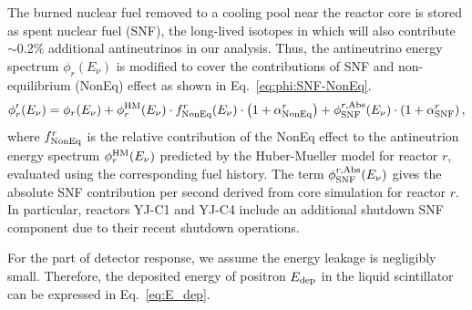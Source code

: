 The burned nuclear fuel removed to a cooling pool near the reactor core is stored as spent nuclear fuel (SNF), the long-lived isotopes in which will also contribute $\sim$0.2\% additional antineutrinos in our analysis. Thus, the antineutrino energy spectrum $\phi_r(E_{\nu})$ is modified to cover the contributions of SNF and non-equilibrium (NonEq) effect as shown in Eq.~\eqref{eq:phi:SNF-NonEq}.
\begin{equation}
    \phi^\prime_r(E_{\nu})=\phi_r(E_{\nu})+\phi_r^{\rm HM}(E_{\nu}) \cdot f_{\rm NonEq}^r(E_{\nu})\cdot \left(1+\alpha_{\rm NonEq}^r\right)+\phi_{\rm SNF}^{r,\rm Abs}(E_{\nu})\cdot\left(1+\alpha_{\rm SNF}^r\right),
    \label{eq:phi:SNF-NonEq}
\end{equation}
where $f_{\rm NonEq}^r$ is the relative contribution of the NonEq effect to the antineutrion energy spectrum $\phi_r^{\rm HM}(E_{\nu})$ predicted by the Huber-Mueller model for reactor $r$, evaluated using the corresponding fuel history. The term $\phi_{\rm SNF}^{r,\rm Abs}(E_{\nu})$ gives the absolute SNF contribution per second derived from core simulation for reactor $r$. In particular, reactors YJ-C1 and YJ-C4 include an additional shutdown SNF component due to their recent shutdown operations.

For the part of detector response, we assume the energy leakage is negligibly small. Therefore, the deposited energy of positron $E_{\rm dep}$ in the liquid scintillator can be expressed in Eq.~\eqref{eq:E_dep}.

